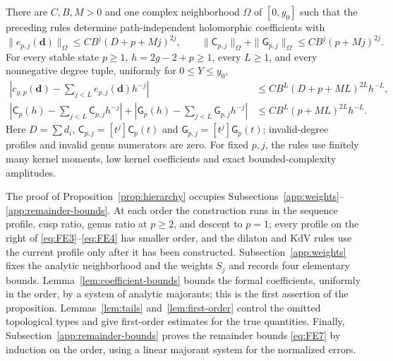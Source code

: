 \begin{proposition}\label{prop:hierarchy}
There are $C,B,M>0$ and one complex neighborhood $\Omega$ of
$[0,y_0]$ such that the preceding rules determine path-independent
holomorphic coefficients with
\[
 \|e_{p,j}(\mathbf d)\|_\Omega\le CB^j(D+p+Mj)^{2j},\qquad
 \|\mathsf C_{p,j}\|_\Omega+\|\mathsf G_{p,j}\|_\Omega
       \le CB^j(p+Mj)^{2j}.
\]
For every stable state $p\ge1$, $h=2g-2+p\ge1$, every $L\ge1$,
and every nonnegative degree tuple, uniformly for $0\le Y\le y_0$,
\begin{equation}
 \begin{split}
 \left|c_{g,p}(\mathbf d)-\sum_{j<L}e_{p,j}(\mathbf d)h^{-j}\right|
       &\le CB^L(D+p+ML)^{2L}h^{-L},\\
 \left|\mathsf C_p(h)-\sum_{j<L}\mathsf C_{p,j}h^{-j}\right|
 +\left|\mathsf G_p(h)-\sum_{j<L}\mathsf G_{p,j}h^{-j}\right|
       &\le CB^L(p+ML)^{2L}h^{-L}.
 \end{split}
 \label{eq:FE7}
\end{equation}
Here $D=\sum d_i$, $\mathsf C_{p,j}=[t^j]\mathsf C_p(t)$ and
$\mathsf G_{p,j}=[t^j]\mathsf G_p(t)$; invalid-degree profiles and invalid genus numerators
are zero. For fixed $p,j$, the rules use finitely many kernel moments,
low kernel coefficients and exact bounded-complexity amplitudes.
\end{proposition}

The proof of Proposition~\ref{prop:hierarchy} occupies
Subsections~\ref{app:weights}--\ref{app:remainder-bounds}. At each order the
construction runs in the sequence profile, cusp ratio, genus ratio at
$p\ge2$, and descent to $p=1$; every profile on the right of
\eqref{eq:FE3}--\eqref{eq:FE4} has smaller order, and the dilaton and KdV
rules use the current profile only after it has been constructed.
Subsection~\ref{app:weights} fixes the analytic neighborhood and the
weights $S_j$ and records four elementary bounds.
Lemma~\ref{lem:coefficient-bounds} bounds the formal coefficients,
uniformly in the order, by a system of analytic majorants; this is the
first assertion of the proposition. Lemmas~\ref{lem:tails}
and~\ref{lem:first-order} control the omitted topological types and give
first-order estimates for the true quantities. Finally,
Subsection~\ref{app:remainder-bounds} proves the remainder bounds
\eqref{eq:FE7} by induction on the order, using a linear majorant system
for the normalized errors.

